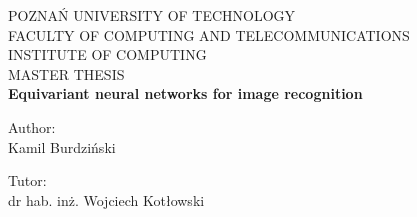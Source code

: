 \documentclass[12pt,a4paper]{article}
\begin{document}
\begin{titlepage}
   \begin{center}
       \vspace*{0.5cm}
POZNAŃ UNIVERSITY OF TECHNOLOGY \\
FACULTY OF COMPUTING AND TELECOMMUNICATIONS \\
       INSTITUTE OF COMPUTING \\

       \vspace*{2cm}
       {\Large MASTER THESIS} \\

       \vspace*{1cm}
       \textbf{\Huge Equivariant neural networks for image recognition}  \normalfont \\

       \vspace{5cm}
       \begin{doublespace}
       Author: \\
       {\Large Kamil Burdziński} \\
       \end{doublespace}
       \vspace{4cm}
       \begin{doublespace}
       Tutor:\\
       {\Large dr hab. inż. Wojciech Kotłowski}
       \end{doublespace}
   \end{center}
\end{titlepage}

\cleardoublepage%


\tableofcontents
\thispagestyle{empty}

\cleardoublepage
{}

%






\printbibliography

\clearpage
\listoffigures
\listoftables
\end{document}
